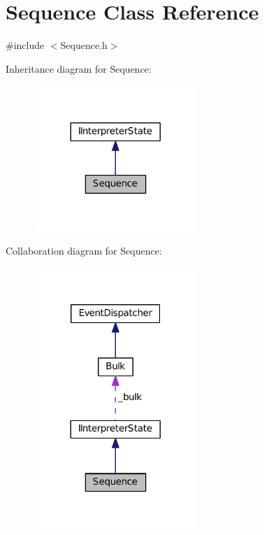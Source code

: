 \hypertarget{class_sequence}{}\section{Sequence Class Reference}
\label{class_sequence}


{\ttfamily \#include $<$Sequence.\+h$>$}



Inheritance diagram for Sequence\+:
\nopagebreak
\begin{figure}[H]
\begin{center}
\leavevmode
\includegraphics[width=176pt]{class_sequence__inherit__graph}
\end{center}
\end{figure}


Collaboration diagram for Sequence\+:
\nopagebreak
\begin{figure}[H]
\begin{center}
\leavevmode
\includegraphics[width=176pt]{class_sequence__coll__graph}
\end{center}
\end{figure}
